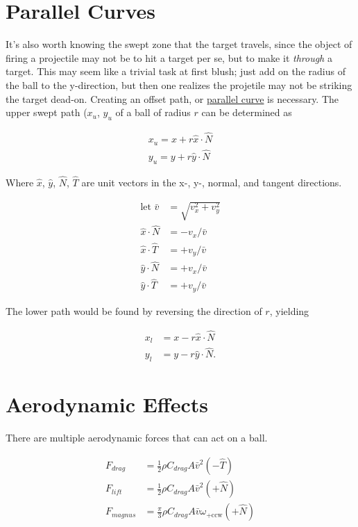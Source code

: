 \documentclass[10pt,letterpaper]{article}
\begin{document}
\section*{Parallel Curves}
	It's also worth knowing the swept zone that the target travels, since the object of firing a projectile may not be to hit a target per se, but to make it \textit{through} a target. This may seem like a trivial task at first blush; just add on the radius of the ball to the y-direction, but then one realizes the projetile may not be striking the target dead-on. Creating an offset path, or \href{https://en.wikipedia.org/wiki/Parallel_curve}{parallel curve} is necessary. The upper swept path ($x_u$, $y_u$ of a ball of radius $r$ can be determined as

	\begin{align}
		x_u = x + r \hat{x} \cdot \hat{N} \\
		y_u = y + r \hat{y} \cdot \hat{N}
	\end{align}

	Where $\hat{x}$, $\hat{y}$, $\hat{N}$, $\hat{T}$ are unit vectors in the x-, y-, normal, and tangent directions.

	\begin{align}
		\text{let } \bar{v} &= \sqrt{v_x^2 + v_y^2} \\
		\hat{x} \cdot \hat{N} &= - v_x / \bar{v} \\
		\hat{x} \cdot \hat{T} &= + v_y / \bar{v} \\
		\hat{y} \cdot \hat{N} &= + v_x / \bar{v} \\
		\hat{y} \cdot \hat{T} &= + v_y / \bar{v}
	\end{align}

	The lower path would be found by reversing the direction of $r$, yielding
	
	\begin{align}
		x_l &= x - r \hat{x} \cdot \hat{N} \\
		y_l &= y - r \hat{y} \cdot \hat{N} .
	\end{align}

\section*{Aerodynamic Effects}
	There are multiple aerodynamic forces that can act on a ball.

	\begin{align}
		F_{drag}   &= \frac{1}{2} \rho C_{drag} A \bar{v}^2 (-\hat{T}) \\
		F_{lift}   &= \frac{1}{2} \rho C_{drag} A \bar{v}^2 (+\hat{N}) \\
		F_{magnus} &= \frac{\pi}{3} \rho C_{drag} A \bar{v} \omega_{\text{+ccw}} (+\hat{N})
	\end{align}	
\end{document}
